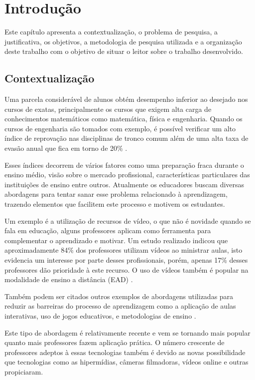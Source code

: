 \chapter[Introdução]{Introdução}

Este capítulo apresenta a contextualização, o problema de pesquisa, a justificativa, os objetivos, a metodologia de pesquisa utilizada e a organização deste trabalho com o objetivo de situar o leitor sobre o trabalho desenvolvido.

\section{Contextualização}

Uma parcela considerável de alunos obtém desempenho inferior ao desejado nos cursos de exatas, principalmente os cursos que exigem alta carga de conhecimentos matemáticos como matemática, física e engenharia. Quando os cursos de engenharia são tomados com exemplo, é possível verificar um alto índice de reprovação nas disciplinas de tronco comum além de uma alta taxa de evasão anual que fica em torno de 20\% \cite{fragelli2012summae}.

Esses índices decorrem de vários fatores como uma preparação fraca durante o ensino médio, visão sobre o mercado profissional, características particulares das instituições de ensino entre outros. Atualmente os educadores buscam diversas abordagens para tentar sanar esse problema relacionado à aprendizagem, trazendo elementos que facilitem este processo e motivem os estudantes. 

Um exemplo é a utilização de recursos de vídeo, o que não é novidade quando se fala em educação, alguns professores aplicam como ferramenta para complementar o aprendizado e motivar. Um estudo realizado indicou que aproximadamente 84\% dos professores utilizam vídeos ao ministrar aulas, isto evidencia um interesse por parte desses profissionais, porém, apenas 17\% desses professores dão prioridade à este recurso. O uso de vídeos também é popular na modalidade de ensino a distância (EAD) \cite{vicentini2008uso}. 

Também podem ser citados outros exemplos de abordagens utilizadas para reduzir as barreiras do processo de aprendizagem como a aplicação de aulas interativas, uso de jogos educativos, e metodologias de ensino \cite{fragelli2012osama, fragelli2011batalha, fragelliplaycalculo}.

Este tipo de abordagem é relativamente recente e vem se tornando mais popular quanto mais professores fazem aplicação prática. O número crescente de professores adeptos à essas tecnologias também é devido as novas possibilidade que tecnologias como as hipermídias, câmeras filmadoras, vídeos online e outras propiciaram.

